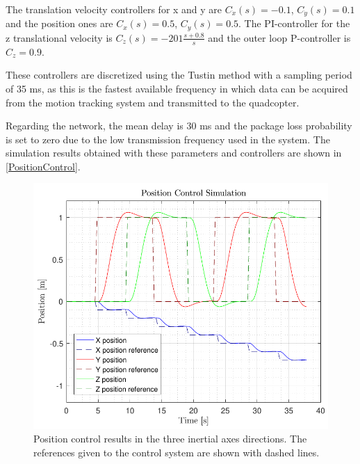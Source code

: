 The translation velocity controllers for x and y are $C_{\dot{x}}(s)= -0.1$, $C_{\dot{y}}(s)= 0.1$ and the position ones are $C_x(s)= 0.5$, $C_y(s)= 0.5$. The PI-controller for the z translational velocity is $C_{\dot{z}}(s)=-201\frac{s+0.8}{s}$ and the outer loop P-controller is $C_z=0.9$.

These controllers are discretized using the Tustin method with a sampling period of 35 ms, as this is the fastest available frequency in which data can be acquired from the motion tracking system and transmitted to the quadcopter.

Regarding the network, the mean delay is 30 ms and the package loss probability is set to zero due to the low transmission frequency used in the system.
The simulation results obtained with these parameters and controllers are shown in \autoref{PositionControl}.
\begin{figure}[H]
	\centering
	\includegraphics[scale=0.5]{figures/PositionControl}
	\caption{Position control results in the three inertial axes directions. The references given to the control system are shown with dashed lines.}
	\label{PositionControl}
\end{figure}

